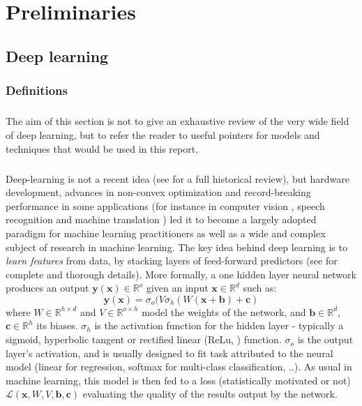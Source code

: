 	\chapter{Preliminaries}
	{
		\label{chap::prel}
		\section{Deep learning}
		{
			\subsection{Definitions}
			\paragraph{} The aim of this section is not to give an exhaustive review of the very wide field of deep learning, but to refer the reader to useful pointers for models and techniques that would be used in this report. 
			
			\paragraph{} Deep-learning is not a recent idea (see \cite{wang2017origin} for a full historical review), but hardware development, advances in non-convex optimization and record-breaking performance in some applications (for instance in computer vision \cite{NIPS2012_4824}, speech recognition \cite{graves2013speech} and machine translation \cite{lecun1998gradient}) led it to become a largely adopted paradigm for machine learning practitioners as well as a wide and complex subject of research in machine learning. The key idea behind deep learning is to \emph{learn features} from data, by stacking layers of feed-forward predictors (see \cite{goodfellow2016} for complete and thorough details). More formally, a one hidden layer neural network produces an output $\mathbf{y}(\mathbf{x})\in\mathbb{R}^o$ given an input $\mathbf{x}\in\mathbb{R}^d$ such as:
			\begin{equation}
				\mathbf{y}(\mathbf{x}) = \sigma_o (V\sigma_h(W(\mathbf{x+b})+\mathbf{c})
				\label{eq::nnmodel}
			\end{equation}
			where $W\in\mathbb{R}^{h\times d}$ and $V\in\mathbb{R}^{o\times h}$ model the weights of the network, and $\mathbf{b}\in\mathbb{R}^d$, $\mathbf{c}\in\mathbb{R}^h$ its biases. $\sigma_h$ is the activation function for the hidden layer - typically a sigmoid, hyperbolic tangent or rectified linear (ReLu, \cite{nair2010rectified}) function. $\sigma_o$ is the output layer's activation, and is usually designed to fit task attributed to the neural model (linear for regression, softmax for multi-class classification, ..). As usual in machine learning, this model is then fed to a loss (statistically motivated or not) $\mathcal{L}(\mathbf{x},W,V,\mathbf{b},\mathbf{c})$ evaluating the quality of the results output by the network. 
			
}}
